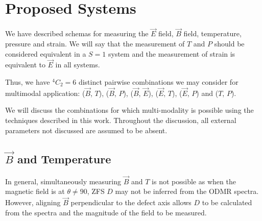 
%

\section{Proposed Systems}
We have described schemas for measuring the $\vec{E}$ field, $\vec{B}$ field, temperature, pressure and strain. We will say that the measurement of $T$ and $P$ should be considered equivalent in a $S=1$ system and the measurement of strain is equivalent to $\vec{E}$ in all systems.

Thus, we have $^4 C _2 = 6$ distinct pairwise combinations we may consider for multimodal application:
($\vec{B}$, $T$), ($\vec{B}$, $P$), ($\vec{B}$, $\vec{E}$), ($\vec{E}$, $T$), ($\vec{E}$, $P$) and ($T$, $P$).

We will discuss the combinations for which multi-modality is possible using the techniques described in this work.
Throughout the discussion, all external parameters not discussed are assumed to be absent.

\subsection{$\vec{B}$ and Temperature}\label{sec:multimode_BT}
In general, simultaneously measuring $\vec{B}$ and $T$ is not possible as when the magnetic field is at $\theta \neq 90$, ZFS $D$ may not be inferred from the ODMR spectra. However, aligning $\vec{B}$ perpendicular to the defect axis allows $D$ to be calculated from the spectra and the magnitude of the field to be measured. 

